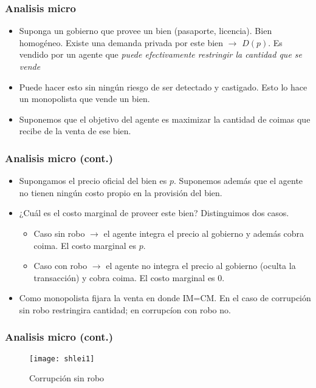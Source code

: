 \documentclass[handout,final,xcolor=dvipsnames]{beamer}
\begin{document}
\begin{frame}\frametitle{Analisis micro}
\begin{itemize}\itemsep 10pt
\item Suponga un gobierno que provee un bien (pasaporte,
  licencia). Bien homogéneo. Existe una demanda privada por este bien
  $\longrightarrow$ $D(p)$. Es vendido por un agente que \textit{puede
    efectivamente restringir la cantidad que se vende}
\item Puede hacer esto sin ningún riesgo de ser detectado y
  castigado. Esto lo hace un monopolista que vende un bien. 
\item Suponemos que el objetivo del agente es maximizar la cantidad de
  coimas que recibe de la venta de ese bien.
\end{itemize}
\end{frame}



\begin{frame}\frametitle{Analisis micro (cont.)}
\begin{itemize}\itemsep 10pt
\item Supongamos el precio oficial del bien es $p$. Suponemos además
  que el agente no tienen ningún costo propio en la provisión del
  bien. 
\item ¿Cuál es el costo marginal de proveer este bien? Distinguimos
  dos casos. 
\begin{itemize}\itemsep 15pt \medskip 
\item Caso sin robo $\longrightarrow$ el agente integra el precio al
  gobierno y además cobra coima. El costo marginal es $p$. 
\item Caso con robo $\longrightarrow$ el agente no integra el precio
  al gobierno (oculta la transacción) y cobra coima. El costo marginal
  es $0$. 
\end{itemize}
\item Como monopolista fijara la venta en donde IM=CM. En el caso de
  corrupción sin robo restringira cantidad; en corrupcíon con robo
  no. 
\end{itemize}
\end{frame}


\begin{frame}\frametitle{Analisis micro (cont.)}
  \begin{figure}[htbp]
    \centering \vspace{-2cm}
    \texttt{[image: shlei1]}
    \caption{Corrupción sin robo}
  \end{figure}
\end{frame}
\end{document}

